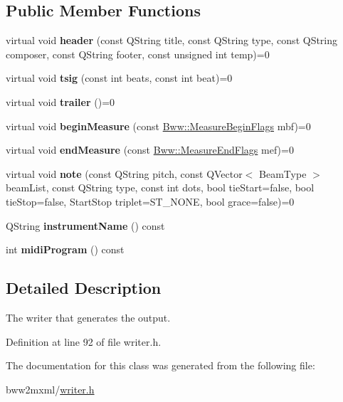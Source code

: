 \subsection*{Public Member Functions}
\begin{DoxyCompactItemize}
\item 
\mbox{\label{class_bww_1_1_writer_a15d22cd5077435cf769d03c79652fffe}} 
virtual void {\bfseries header} (const Q\+String title, const Q\+String type, const Q\+String composer, const Q\+String footer, const unsigned int temp)=0
\item 
\mbox{\label{class_bww_1_1_writer_a3bf4eef6a8ecca5e9a61d389704bfc44}} 
virtual void {\bfseries tsig} (const int beats, const int beat)=0
\item 
\mbox{\label{class_bww_1_1_writer_abc0884ddeed241b2b771270ca59a64af}} 
virtual void {\bfseries trailer} ()=0
\item 
\mbox{\label{class_bww_1_1_writer_a2f2af7af43c06d26494b7daf22da7f6f}} 
virtual void {\bfseries begin\+Measure} (const \hyperlink{struct_bww_1_1_measure_begin_flags}{Bww\+::\+Measure\+Begin\+Flags} mbf)=0
\item 
\mbox{\label{class_bww_1_1_writer_a74857356866276109e1b6f44df5c43e4}} 
virtual void {\bfseries end\+Measure} (const \hyperlink{struct_bww_1_1_measure_end_flags}{Bww\+::\+Measure\+End\+Flags} mef)=0
\item 
\mbox{\label{class_bww_1_1_writer_a1aeecae72bec20c8946f25683da39e7e}} 
virtual void {\bfseries note} (const Q\+String pitch, const Q\+Vector$<$ Beam\+Type $>$ beam\+List, const Q\+String type, const int dots, bool tie\+Start=false, bool tie\+Stop=false, Start\+Stop triplet=S\+T\+\_\+\+N\+O\+NE, bool grace=false)=0
\item 
\mbox{\label{class_bww_1_1_writer_af8a76e821a2e66823c0fb8b39821897f}} 
Q\+String {\bfseries instrument\+Name} () const
\item 
\mbox{\label{class_bww_1_1_writer_a64dc0f60dda5dbf53dbe2e23b5f48944}} 
int {\bfseries midi\+Program} () const
\end{DoxyCompactItemize}


\subsection{Detailed Description}
The writer that generates the output. 

Definition at line 92 of file writer.\+h.



The documentation for this class was generated from the following file\+:\begin{DoxyCompactItemize}
\item 
bww2mxml/\hyperlink{writer_8h}{writer.\+h}\end{DoxyCompactItemize}
